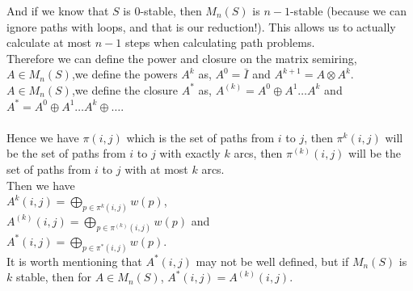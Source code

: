 \documentclass[a4paper,12pt,twoside,openright]{report}
\begin{document}
And if we know that $S$ is 0-stable, then $M_n(S)$ is $n-1$-stable (because we can ignore paths with loops, and that is our reduction!). 
This allows us to actually calculate at most $n-1$ steps when calculating path problems.\\
Therefore we can define the power and closure on the matrix semiring,\\
$A\in M_n(S)$,we define the powers $A^k$ as, $A^0 = \bar{I}$ and $A^{k+1} = A \otimes A^k$.\\
$A\in M_n(S)$,we define the closure $A^*$ as, $A^{(k)} = A^0 \oplus A^1 \dots  A^k$ and $A^* = A^0 \oplus A^1 \dots  A^k \oplus \dots$.\\\\
Hence we have $\pi(i,j)$ which is the set of paths from $i$ to $j$, then $\pi^k(i,j)$ will be the set of paths from $i$ to $j$ with exactly $k$ arcs, then $\pi^{(k)}(i,j)$ will be the set of paths from $i$ to $j$ with at most $k$ arcs.\\
Then we have \\
$A^k(i,j) = \bigoplus_{p \in \pi^k (i,j)}w(p)$, \\
$A^{(k)}(i,j) = \bigoplus_{p \in \pi^{(k)} (i,j)}w(p)$ and\\
$A^*(i,j) = \bigoplus_{p \in \pi^* (i,j)}w(p)$.\\
It is worth mentioning that $A^*(i,j)$ may not be well defined, but if $M_n(S)$ is $k$ stable, then for $A\in M_n(S)$, $A^*(i,j) = A^{(k)}(i,j)$.
\end{document}
